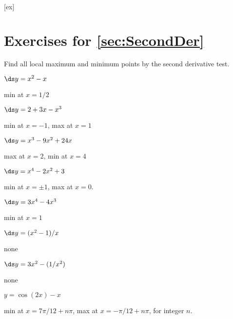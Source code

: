 [ex]
\section*{Exercises for \ref{sec:SecondDer}}

\begin{enumialphparenastyle}

Find all local maximum and minimum points by the second derivative test. 


\begin{ex}
 $\ds y=x^2-x$ 
\begin{sol}
 min at $x=1/2$
\end{sol}
\end{ex}

\begin{ex}
 $\ds y=2+3x-x^3$ 
\begin{sol}
 min at $x=-1$, max at $x=1$
\end{sol}
\end{ex}

\begin{ex}
 $\ds y=x^3-9x^2+24x$
\begin{sol}
 max at $x=2$, min at $x=4$
\end{sol}
\end{ex}

\begin{ex}
 $\ds y=x^4-2x^2+3$ 
\begin{sol}
 min at $x=\pm 1$, max at $x=0$.
\end{sol}
\end{ex}

\begin{ex}
 $\ds y=3x^4-4x^3$
\begin{sol}
 min at $x=1$
\end{sol}
\end{ex}

\begin{ex}
 $\ds y=(x^2-1)/x$
\begin{sol}
 none
\end{sol}
\end{ex}

\begin{ex}
 $\ds y=3x^2-(1/x^2)$ 
\begin{sol}
 none
\end{sol}
\end{ex}

\begin{ex}
 $y=\cos(2x)-x$ 
\begin{sol}
 min at $x=7\pi/12+n\pi$, max at $x=-\pi/12+n\pi$, for integer $n$.
\end{sol}
\end{ex}


\end{enumialphparenastyle}
